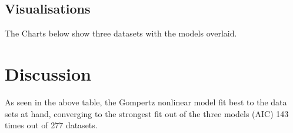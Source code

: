 \documentclass{article}
\begin{document}
        \subsection{Visualisations}
        The Charts below show three datasets with the models overlaid. 
    \section{Discussion}
    As seen in the above table, the Gompertz nonlinear model fit best to the data sets at hand, 
    converging to the strongest fit out of the three models (AIC) 143 times out of 277 datasets.
\end{document}
